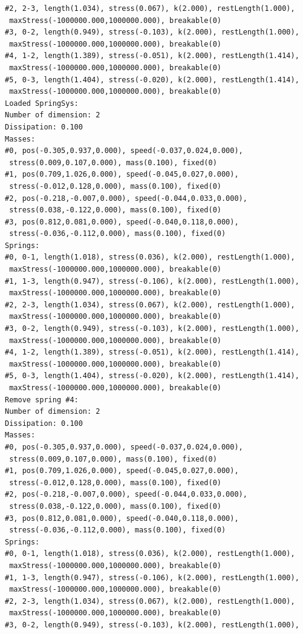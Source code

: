 \documentclass[12pt, a4paper]{article}
\begin{document}
\begin{scriptsize}
\begin{ttfamily}
\begin{lstlisting}
#2, 2-3, length(1.034), stress(0.067), k(2.000), restLength(1.000),
 maxStress(-1000000.000,1000000.000), breakable(0)
#3, 0-2, length(0.949), stress(-0.103), k(2.000), restLength(1.000),
 maxStress(-1000000.000,1000000.000), breakable(0)
#4, 1-2, length(1.389), stress(-0.051), k(2.000), restLength(1.414),
 maxStress(-1000000.000,1000000.000), breakable(0)
#5, 0-3, length(1.404), stress(-0.020), k(2.000), restLength(1.414),
 maxStress(-1000000.000,1000000.000), breakable(0)
Loaded SpringSys:
Number of dimension: 2
Dissipation: 0.100
Masses:
#0, pos(-0.305,0.937,0.000), speed(-0.037,0.024,0.000),
 stress(0.009,0.107,0.000), mass(0.100), fixed(0)
#1, pos(0.709,1.026,0.000), speed(-0.045,0.027,0.000),
 stress(-0.012,0.128,0.000), mass(0.100), fixed(0)
#2, pos(-0.218,-0.007,0.000), speed(-0.044,0.033,0.000),
 stress(0.038,-0.122,0.000), mass(0.100), fixed(0)
#3, pos(0.812,0.081,0.000), speed(-0.040,0.118,0.000),
 stress(-0.036,-0.112,0.000), mass(0.100), fixed(0)
Springs:
#0, 0-1, length(1.018), stress(0.036), k(2.000), restLength(1.000),
 maxStress(-1000000.000,1000000.000), breakable(0)
#1, 1-3, length(0.947), stress(-0.106), k(2.000), restLength(1.000),
 maxStress(-1000000.000,1000000.000), breakable(0)
#2, 2-3, length(1.034), stress(0.067), k(2.000), restLength(1.000),
 maxStress(-1000000.000,1000000.000), breakable(0)
#3, 0-2, length(0.949), stress(-0.103), k(2.000), restLength(1.000),
 maxStress(-1000000.000,1000000.000), breakable(0)
#4, 1-2, length(1.389), stress(-0.051), k(2.000), restLength(1.414),
 maxStress(-1000000.000,1000000.000), breakable(0)
#5, 0-3, length(1.404), stress(-0.020), k(2.000), restLength(1.414),
 maxStress(-1000000.000,1000000.000), breakable(0)
Remove spring #4:
Number of dimension: 2
Dissipation: 0.100
Masses:
#0, pos(-0.305,0.937,0.000), speed(-0.037,0.024,0.000),
 stress(0.009,0.107,0.000), mass(0.100), fixed(0)
#1, pos(0.709,1.026,0.000), speed(-0.045,0.027,0.000),
 stress(-0.012,0.128,0.000), mass(0.100), fixed(0)
#2, pos(-0.218,-0.007,0.000), speed(-0.044,0.033,0.000),
 stress(0.038,-0.122,0.000), mass(0.100), fixed(0)
#3, pos(0.812,0.081,0.000), speed(-0.040,0.118,0.000),
 stress(-0.036,-0.112,0.000), mass(0.100), fixed(0)
Springs:
#0, 0-1, length(1.018), stress(0.036), k(2.000), restLength(1.000),
 maxStress(-1000000.000,1000000.000), breakable(0)
#1, 1-3, length(0.947), stress(-0.106), k(2.000), restLength(1.000),
 maxStress(-1000000.000,1000000.000), breakable(0)
#2, 2-3, length(1.034), stress(0.067), k(2.000), restLength(1.000),
 maxStress(-1000000.000,1000000.000), breakable(0)
#3, 0-2, length(0.949), stress(-0.103), k(2.000), restLength(1.000),

\end{lstlisting}
\end{ttfamily}
\end{scriptsize}
\end{document}
